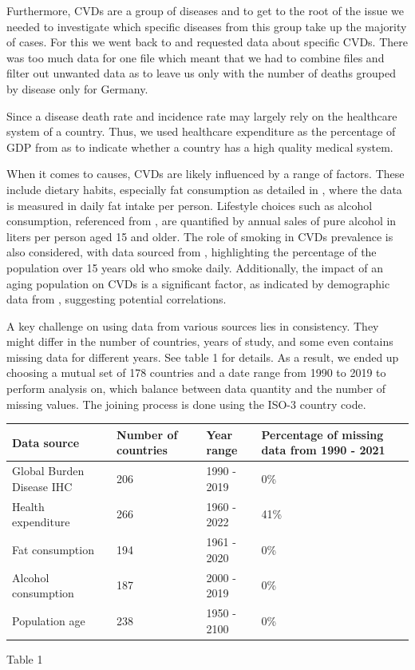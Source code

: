 Furthermore, CVDs are a group of diseases and to get to the root of the issue we needed to investigate which specific diseases from this group take up the majority of cases. For this we went back to \citep{GBD2019} and requested data about specific CVDs. There was too much data for one file which meant that we had to combine files and filter out unwanted data as to leave us only with the number of deaths grouped by disease only for Germany. 

Since a disease death rate and incidence rate may largely rely on the healthcare system of a country. Thus, we used healthcare expenditure as the percentage of GDP from \citep{health_expenditure} as to indicate whether a country has a high quality medical system.

When it comes to causes, CVDs are likely influenced by a range of factors. These include dietary habits, especially fat consumption as detailed in \citep{fat_consumption}, where the data is measured in daily fat intake per person. Lifestyle choices such as alcohol consumption, referenced from \citep{alcohol_consumption}, are quantified by annual sales of pure alcohol in liters per person aged 15 and older. The role of smoking in CVDs prevalence is also considered, with data sourced from \citep{smoking}, highlighting the percentage of the population over 15 years old who smoke daily. Additionally, the impact of an aging population on CVDs is a significant factor, as indicated by demographic data from \citep{age}, suggesting potential correlations. 

A key challenge on using data from various sources lies in consistency. They might differ in the number of countries, years of study, and some even contains missing data for different years. See table 1 for details. As a result, we ended up choosing a mutual set of 178 countries and a date range from 1990 to 2019 to perform analysis on, which balance between data quantity and the number of missing values. The joining process is done using the ISO-3 country code.


\begin{tabular}{|p{2cm}|p{1cm}|p{2cm}|p{2cm}|}
\hline
Data source & Number of countries & Year range & Percentage of missing data from 1990 - 2021\\
\hline
Global Burden Disease IHC & 206 & 1990 - 2019 & 0\%\\
Health expenditure & 266 & 1960 - 2022 & 41\%\\
Fat consumption & 194 & 1961 - 2020 & 0\%\\
Alcohol consumption & 187 & 2000 - 2019 & 0\%\\
Population age & 238 & 1950 - 2100 & 0\%\\
\hline
\end{tabular}
Table 1


